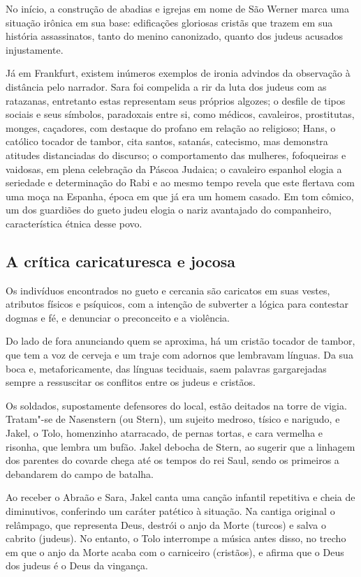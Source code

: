 \documentclass[12pt]{extarticle}
\begin{document}
No início, a construção de abadias e igrejas em nome de São Werner marca
uma situação irônica em sua base: edificações gloriosas cristãs que
trazem em sua história assassinatos, tanto do menino canonizado, quanto
dos judeus acusados injustamente.

Já em Frankfurt, existem inúmeros exemplos de ironia advindos da
observação à distância pelo narrador. Sara foi compelida a rir da luta
dos judeus com as ratazanas, entretanto estas representam seus próprios
algozes; o desfile de tipos sociais e seus símbolos, paradoxais entre
si, como médicos, cavaleiros, prostitutas, monges, caçadores, com
destaque do profano em relação ao religioso; Hans, o católico tocador de
tambor, cita santos, satanás, catecismo, mas demonstra atitudes
distanciadas do discurso; o comportamento das mulheres, fofoqueiras e
vaidosas, em plena celebração da Páscoa Judaica; o cavaleiro espanhol
elogia a seriedade e determinação do Rabi e ao mesmo tempo revela que
este flertava com uma moça na Espanha, época em que já era um homem
casado. Em tom cômico, um dos guardiões do gueto judeu elogia o nariz
avantajado do companheiro, característica étnica desse povo.

\subsection{A crítica caricaturesca e jocosa}

Os indivíduos encontrados no gueto e cercania são caricatos em suas
vestes, atributos físicos e psíquicos, com a intenção de subverter a
lógica para contestar dogmas e fé, e denunciar o preconceito e a
violência.

Do lado de fora anunciando quem se aproxima, há um cristão tocador de
tambor, que tem a voz de cerveja e um traje com adornos que lembravam
línguas. Da sua boca e, metaforicamente, das línguas teciduais, saem
palavras gargarejadas sempre a ressuscitar os conflitos entre os judeus
e cristãos.

Os soldados, supostamente defensores do local, estão deitados na torre
de vigia. Tratam"-se de Nasenstern (ou Stern), um sujeito medroso, tísico
e narigudo, e Jakel, o Tolo, homenzinho atarracado, de pernas tortas, e
cara vermelha e risonha, que lembra um bufão. Jakel debocha de Stern, ao
sugerir que a linhagem dos parentes do covarde chega até os tempos do
rei Saul, sendo os primeiros a debandarem do campo de batalha.

Ao receber o Abraão e Sara, Jakel canta uma canção infantil repetitiva e
cheia de diminutivos, conferindo um caráter patético à situação. Na
cantiga original o relâmpago, que representa Deus, destrói o anjo da
Morte (turcos) e salva o cabrito (judeus). No entanto, o Tolo interrompe
a música antes disso, no trecho em que o anjo da Morte acaba com o
carniceiro (cristãos), e afirma que o Deus dos judeus é o Deus da
vingança.
\end{document}
